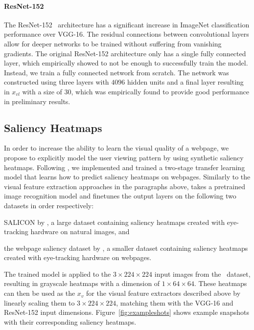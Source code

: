 \paragraph{ResNet-152}
The ResNet-152~\cite{he2016deep} architecture has a significant increase in ImageNet classification performance over VGG-16. The residual connections between convolutional layers allow for deeper networks to be trained without suffering from vanishing gradients. The original ResNet-152 architecture only has a single fully connected layer, which empirically showed to not be enough to successfully train the model. Instead, we train a fully connected network from scratch. The network was constructed using three layers with $4096$ hidden units and a final layer resulting in $x_{vl}$ with a size of $30$, which was empirically found to provide good performance in preliminary results.

\subsection{Saliency Heatmaps} \label{sec:saliency}
In order to increase the ability to learn the visual quality of a webpage, we propose to explicitly model the user viewing pattern by using synthetic saliency heatmaps. 
Following \cite{shan2017two}, we implemented and trained a two-stage transfer learning model that learns how to predict saliency heatmaps on webpages.
Similarly to the visual feature extraction approaches in the paragraphs above, \cite{shan2017two} takes a pretrained image recognition model and finetunes the output layers on the following two datasets in order respectively:
\begin{inparaenum}[(i)]
\item SALICON by \cite{jiang2015salicon}, a large dataset containing saliency heatmaps created with eye-tracking hardware on natural images, and 
\item the webpage saliency dataset by \cite{shen2014webpage}, a smaller dataset containing saliency heatmaps created with eye-tracking hardware on webpages.
\end{inparaenum}

The trained model is applied to the $3\times224\times224$ input images from the \datasetname~data\-set, resulting in grayscale heatmaps with a dimension of $1\times64\times64$. These heatmaps can then be used as the $x_{v}$ for the visual feature extractors described above by linearly scaling them to $3\times224\times224$, matching them with the VGG-16 and ResNet-152 input dimensions. Figure~\ref{fig:exampleshots} shows example snapshots with their corresponding saliency heatmaps.


